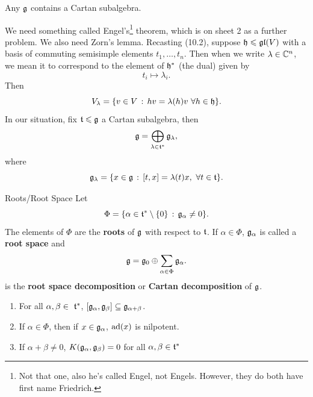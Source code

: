 \documentclass{article}
\begin{document}
\endproof
\begin{fancylem}{}
    Any $\mathfrak{g}$ contains a Cartan subalgebra.\\ \hspace{0.1cm}
\end{fancylem}
\proof We need something called Engel's\footnote{Not that one, also he's called Engel, not Engels. However, they do both have first name Friedrich.} theorem, which is on sheet 2 as a further problem. We also need Zorn's lemma.
 \gap Recasting (10.2), suppose $\mathfrak{h} \leqslant \mathfrak{gl}(V)$ with a basis of commuting semisimple elements $t_{1}, \dots, t_{n}$. Then when we write $\lambda \in \mathbb{C}^{n}$, we mean it to correspond to the element of $\mathfrak{h}^{*}$ (the dual) given by \[ t_{i} \mapsto \lambda_{i}.\] Then \[V_{\lambda} = \{ v \in V \, : \, hv = \lambda(h)v \, \, \forall h \in \mathfrak{h} \}. \] 
In our situation, fix $\mathfrak{t} \leqslant \mathfrak{g}$ a Cartan subalgebra, then \[ \mathfrak{g} = \bigoplus_{\lambda \in \mathfrak{t}^{*}} \mathfrak{g}_{\lambda},\] where \[ \mathfrak{g}_{\lambda} = \{ x \in \mathfrak{g} \, : \, [t,x] = \lambda(t)x, \, \, \forall t \in \mathfrak{t} \}. \]
\endproof
\begin{fancydefine}{Roots/Root Space}
    Let \[ \Phi = \{ \alpha \in \mathfrak{t}^{*} \setminus \{0 \} \, : \, \mathfrak{g}_{\alpha} \neq 0 \}. \] The elements of $\Phi$ are the \textbf{roots} of $\mathfrak{g}$ with respect to $\mathfrak{t}$. If $\alpha \in \Phi$, $\mathfrak{g}_{\alpha}$ is called a \textbf{root space} and \[ \mathfrak{g} = \mathfrak{g}_{0} \oplus \sum_{\alpha \in \Phi} \mathfrak{g}_{\alpha}. \] is the \textbf{root space decomposition} or \textbf{Cartan decomposition} of $\mathfrak{g}$.
\end{fancydefine}
\begin{fancyprop}{}\hspace{0.1cm}
    \begin{enumerate}
        \item For all $\alpha, \beta \in\ \frakt^{*}$, $[\mathfrak{g}_{\alpha}, \mathfrak{g}_{\beta}] \subseteq \mathfrak{g}_{\alpha + \beta}$.
        \item If $\alpha \in \Phi$, then if $x \in \mathfrak{g}_{\alpha}$, $\operatorname{ad}(x)$ is nilpotent.
        \item If $\alpha + \beta \neq 0$, $K(\mathfrak{g}_{\alpha},\mathfrak{g}_{\beta}) = 0$ for all $\alpha, \beta \in \mathfrak{t}^{*}$
    \end{enumerate}
\end{fancyprop}
\end{document}
